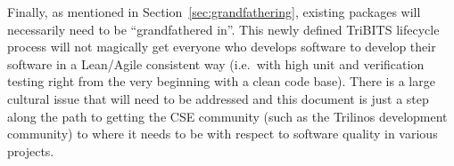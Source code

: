 \documentclass[11pt]{SANDreport}
\begin{document}

Finally, as mentioned in Section~\ref{sec:grandfathering}, existing
packages will necessarily need to be ``grandfathered in''.  This newly
defined TriBITS lifecycle process will not magically get everyone who
develops software to develop their software in a Lean/Agile consistent
way (i.e.\ with high unit and verification testing right from the very
beginning with a clean code base).  There is a large cultural issue
that will need to be addressed and this document is just a step along
the path to getting the CSE community (such as the Trilinos development
community) to where it needs to be with respect to software quality in
various projects.
\end{document}
